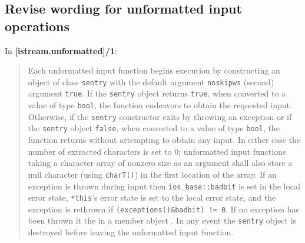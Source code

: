 \documentclass{wg21}
\begin{document}
\subsection{Revise wording for unformatted input operations}
In \textbf{[istream.unformatted]/1}:
\begin{quote}
Each unformatted input function begins execution by constructing  an object
of class \texttt{sentry} with the default argument \texttt{noskipws} (second)
argument \texttt{true}. If the \texttt{sentry} object returns \texttt{true},
when converted to a value of type \texttt{bool}, the function endeavors to
obtain the requested input. Otherwise, if the \texttt{sentry} constructor
exits by throwing an exception or if the \texttt{sentry} object 
\texttt{false}, when converted to a value of type \texttt{bool}, the
function returns without attempting to obtain any input. In either case
the number of extracted characters is set to 0; unformatted input functions
taking a character array of nonzero size as an argument shall also store
a null character (using \texttt{charT()}) in the first location of the
array.  If an exception is thrown during input then
{\texttt{ios_base::badbit} is set in the local error state, \texttt{*this}'s
error state is set to the local error state, and the exception is rethrown
if \texttt{(exceptions()\&badbit) != 0}.}
If no exception has been thrown it  the
 in a member object
.  In any event the \texttt{sentry} object is destroyed
before leaving the unformatted input function.
\end{quote}
\end{document}
